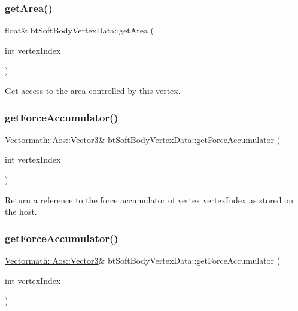 \subsubsection{\texorpdfstring{get\+Area()}{getArea()}\hspace{0.1cm}{\footnotesize\ttfamily [2/2]}}
{\footnotesize\ttfamily float\& bt\+Soft\+Body\+Vertex\+Data\+::get\+Area (\begin{DoxyParamCaption}\item[{int}]{vertex\+Index }\end{DoxyParamCaption})\hspace{0.3cm}{\ttfamily [inline]}}

Get access to the area controlled by this vertex. \mbox{\label{classbtSoftBodyVertexData_a34e1fdb82d6db75a4c22409632c3b369}} 
\subsubsection{\texorpdfstring{get\+Force\+Accumulator()}{getForceAccumulator()}\hspace{0.1cm}{\footnotesize\ttfamily [1/2]}}
{\footnotesize\ttfamily \hyperlink{classVectormath_1_1Aos_1_1Vector3}{Vectormath\+::\+Aos\+::\+Vector3}\& bt\+Soft\+Body\+Vertex\+Data\+::get\+Force\+Accumulator (\begin{DoxyParamCaption}\item[{int}]{vertex\+Index }\end{DoxyParamCaption})\hspace{0.3cm}{\ttfamily [inline]}}

Return a reference to the force accumulator of vertex vertex\+Index as stored on the host. \mbox{\label{classbtSoftBodyVertexData_a34e1fdb82d6db75a4c22409632c3b369}} 
\subsubsection{\texorpdfstring{get\+Force\+Accumulator()}{getForceAccumulator()}\hspace{0.1cm}{\footnotesize\ttfamily [2/2]}}
{\footnotesize\ttfamily \hyperlink{classVectormath_1_1Aos_1_1Vector3}{Vectormath\+::\+Aos\+::\+Vector3}\& bt\+Soft\+Body\+Vertex\+Data\+::get\+Force\+Accumulator (\begin{DoxyParamCaption}\item[{int}]{vertex\+Index }\end{DoxyParamCaption})\hspace{0.3cm}{\ttfamily [inline]}}

